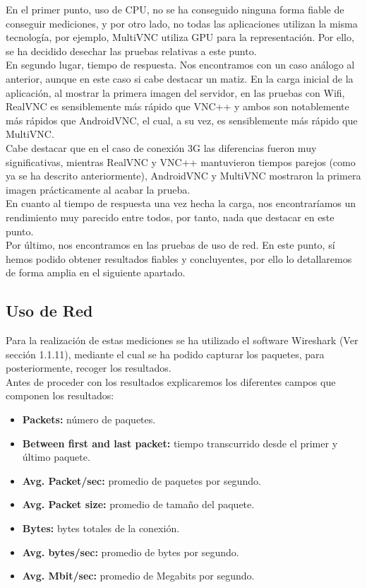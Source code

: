 En el primer punto, uso de CPU, no se ha conseguido ninguna forma fiable de conseguir mediciones, y por otro lado, no todas las aplicaciones utilizan la misma tecnología, por ejemplo, MultiVNC utiliza GPU para la representación. Por ello, se ha decidido desechar las pruebas relativas a este punto.\\

En segundo lugar, tiempo de respuesta. Nos encontramos con un caso análogo al anterior, aunque en este caso si cabe destacar un matiz. En la carga inicial de la aplicación, al mostrar la primera imagen del servidor, en las pruebas con Wifi, RealVNC es sensiblemente más rápido que VNC++ y ambos son notablemente más rápidos que AndroidVNC, el cual, a su vez, es sensiblemente más rápido que MultiVNC.\\

Cabe destacar que en el caso de conexión 3G las diferencias fueron muy significativas, mientras RealVNC y VNC++ mantuvieron tiempos parejos (como ya se ha descrito anteriormente), AndroidVNC y MultiVNC mostraron la primera imagen prácticamente al acabar la prueba.\\

En cuanto al tiempo de respuesta una vez hecha la carga, nos encontraríamos un rendimiento muy parecido entre todos, por tanto, nada que destacar en este punto.\\

Por último, nos encontramos en las pruebas de uso de red. En este punto, sí hemos podido obtener resultados fiables y concluyentes, por ello lo detallaremos de forma amplia en el siguiente apartado.

\subsection{Uso de Red}

Para la realización de estas mediciones se ha utilizado el software Wireshark (Ver sección 1.1.11), mediante el cual se ha podido capturar los paquetes, para posteriormente, recoger los resultados.\\

Antes de proceder con los resultados explicaremos los diferentes campos que componen los resultados:
\begin{itemize}
\item \textbf{Packets:} número de paquetes.
\item \textbf{Between first and last packet:} tiempo transcurrido desde el primer y último paquete.
\item \textbf{Avg. Packet/sec:} promedio de paquetes por segundo.
\item \textbf{Avg. Packet size:} promedio de tamaño del paquete.
\item \textbf{Bytes:} bytes totales de la conexión.
\item \textbf{Avg. bytes/sec:} promedio de bytes por segundo.
\item \textbf{Avg. Mbit/sec:} promedio de Megabits por segundo.
\end{itemize}

